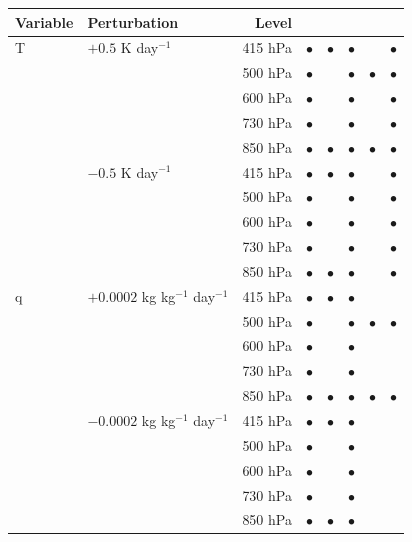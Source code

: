 \documentclass[draft]{agujournal2019}
\begin{document}
{\begin{table}
\begin{tabular}{llrccccc}
        \textbf{Variable} & \textbf{Perturbation} & \textbf{Level} & & & & & \\
        \hline
        T & $+0.5$ K day$^{-1}$ & 415 hPa & $\bullet{}$ & $\bullet{}$ & $\bullet{}$ &  & $\bullet{}$ \\
        & & 500 hPa & $\bullet{}$ & & $\bullet{}$ & $\bullet{}$ & $\bullet{}$ \\
        & & 600 hPa & $\bullet{}$ & & $\bullet{}$ &  & $\bullet{}$ \\
        & & 730 hPa & $\bullet{}$ & & $\bullet{}$ &  & $\bullet{}$ \\
        & & 850 hPa & $\bullet{}$ & $\bullet{}$ & $\bullet{}$ & $\bullet{}$ & $\bullet{}$ \\
        & $-0.5$ K day$^{-1}$ & 415 hPa & $\bullet{}$ & $\bullet{}$ & $\bullet{}$ &  & $\bullet{}$ \\
        & & 500 hPa & $\bullet{}$ & & $\bullet{}$ &  & $\bullet{}$\\
        & & 600 hPa & $\bullet{}$ & & $\bullet{}$ &  & $\bullet{}$ \\
        & & 730 hPa & $\bullet{}$ & & $\bullet{}$ &  & $\bullet{}$ \\
        & & 850 hPa & $\bullet{}$ & $\bullet{}$ & $\bullet{}$ &  & $\bullet{}$ \\
        \hline
        q & $+0.0002$ kg kg$^{-1}$ day$^{-1}$ & 415 hPa & $\bullet{}$ & $\bullet{}$ & $\bullet{}$ &  &  \\
        & & 500 hPa & $\bullet{}$ & & $\bullet{}$ & $\bullet{}$ & $\bullet{}$ \\
        & & 600 hPa & $\bullet{}$ & & $\bullet{}$ &  &  \\
        & & 730 hPa & $\bullet{}$ & & $\bullet{}$ &  &  \\
        & & 850 hPa & $\bullet{}$ & $\bullet{}$ & $\bullet{}$ & $\bullet{}$ & $\bullet{}$ \\
        & $-0.0002$ kg kg$^{-1}$ day$^{-1}$& 415 hPa & $\bullet{}$ & $\bullet{}$ & $\bullet{}$ &  &  \\
        & & 500 hPa & $\bullet{}$ & & $\bullet{}$ &  &  \\
        & & 600 hPa & $\bullet{}$ & & $\bullet{}$ &  &  \\
        & & 730 hPa & $\bullet{}$ & & $\bullet{}$ &  &  \\
        & & 850 hPa & $\bullet{}$ & $\bullet{}$ & $\bullet{}$ &  &  \\
        \hline
    \end{tabular}
\end{table}
}
\end{document}
